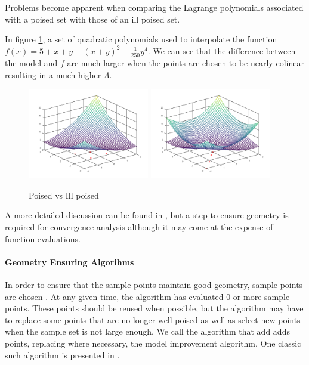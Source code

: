Problems become apparent when comparing the Lagrange polynomials associated with a poised set with those of an ill poised set.

In figure \ref{pvip}, a set of quadratic polynomials used to interpolate the function $f(x) = 5 + x + y + (x + y) ^ 2 - \frac 1 {250} y ^ 4$.
We can see that the difference between the model and $f$ are much larger when the points are chosen to be nearly colinear resulting in a much higher $\Lambda$.

\begin{figure}[h]
    \centering
    \includegraphics[width=200px]{images/poised_good.png}
    \includegraphics[width=200px]{images/poised_bad.png}
    \caption{Poised vs Ill poised}
    \label{pvip}
\end{figure}


\begin{center}

\end{center}

A more detailed discussion can be found in \cite{doi:10.1080/10556780802409296}, but a step to ensure geometry is required for convergence analysis although it may come at the expense of function evaluations.

\paragraph{Geometry Ensuring Algorihms}

In order to ensure that the sample points maintain good geometry, sample points are chosen .
At any given time, the algorithm has evaluated 0 or more sample points.
These points should be reused when possible, but the algorithm may have to replace some points that are no longer well poised as well as select new points when the sample set is not large enough.
We call the algorithm that add adds points, replacing where necessary, the model improvement algorithm.
One classic such algorithm is presented in \cite{DUMMY:intro_book}.

